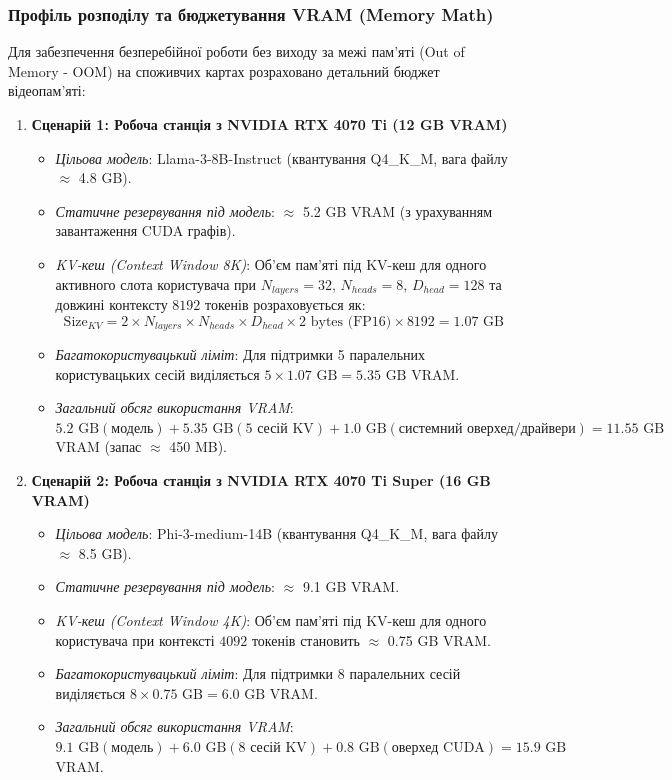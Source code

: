 \documentclass{article}
\begin{document}
\subsubsection{Профіль розподілу та бюджетування VRAM (Memory Math)}

Для забезпечення безперебійної роботи без виходу за межі пам'яті (Out of Memory - OOM) на споживчих картах розраховано детальний бюджет відеопам'яті:

\begin{enumerate}
    \item \textbf{Сценарій 1: Робоча станція з NVIDIA RTX 4070 Ti (12 GB VRAM)}
    \begin{itemize}
        \item \textit{Цільова модель}: Llama-3-8B-Instruct (квантування Q4\_K\_M, вага файлу $\approx$ 4.8 GB).
        \item \textit{Статичне резервування під модель}: $\approx$ 5.2 GB VRAM (з урахуванням завантаження CUDA графів).
        \item \textit{KV-кеш (Context Window 8K)}: Об'єм пам'яті під KV-кеш для одного активного слота користувача при $N_{layers}=32$, $N_{heads}=8$, $D_{head}=128$ та довжині контексту $8192$ токенів розраховується як:
        $$\text{Size}_{KV} = 2 \times N_{layers} \times N_{heads} \times D_{head} \times 2 \text{ bytes (FP16)} \times 8192 = 1.07 \text{ GB}$$
        \item \textit{Багатокористувацький ліміт}: Для підтримки 5 паралельних користувацьких сесій виділяється $5 \times 1.07\text{ GB} = 5.35\text{ GB}$ VRAM.
        \item \textit{Загальний обсяг використання VRAM}: $5.2\text{ GB} (\text{модель}) + 5.35\text{ GB} (5\text{ сесій KV}) + 1.0\text{ GB} (\text{системний оверхед/драйвери}) = 11.55\text{ GB}$ VRAM (запас $\approx$ 450 MB).
    \end{itemize}

    \item \textbf{Сценарій 2: Робоча станція з NVIDIA RTX 4070 Ti Super (16 GB VRAM)}
    \begin{itemize}
        \item \textit{Цільова модель}: Phi-3-medium-14B (квантування Q4\_K\_M, вага файлу $\approx$ 8.5 GB).
        \item \textit{Статичне резервування під модель}: $\approx$ 9.1 GB VRAM.
        \item \textit{KV-кеш (Context Window 4K)}: Об'єм пам'яті під KV-кеш для одного користувача при контексті $4092$ токенів становить $\approx$ 0.75 GB VRAM.
        \item \textit{Багатокористувацький ліміт}: Для підтримки 8 паралельних сесій виділяється $8 \times 0.75\text{ GB} = 6.0\text{ GB}$ VRAM.
        \item \textit{Загальний обсяг використання VRAM}: $9.1\text{ GB} (\text{модель}) + 6.0\text{ GB} (8\text{ сесій KV}) + 0.8\text{ GB} (\text{оверхед CUDA}) = 15.9\text{ GB}$ VRAM.
    \end{itemize}
\end{enumerate}
\end{document}
